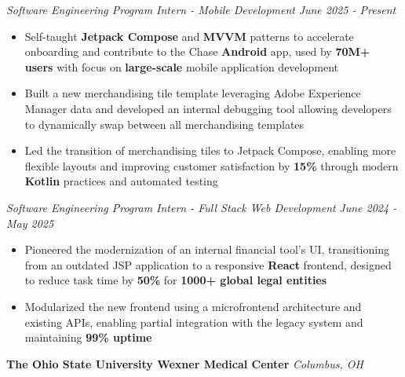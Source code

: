 \documentclass[letterpaper]{article}
\newenvironment{tightitemize}{%
  \begin{itemize}\small\setlength{\baselineskip}{0.95\baselineskip}\itemsep -1mm%
}{\end{itemize}}
\begin{document}
    \textit{Software Engineering Program Intern - Mobile Development} \hfill \textsl{June 2025 - Present}\\
    \vspace{-7pt}
    \begin{tightitemize} \itemsep -1mm

            \item Self-taught \textbf{Jetpack Compose} and \textbf{MVVM} patterns to accelerate onboarding and contribute to the Chase \textbf{Android} app, used by \textbf{70M+ users} with focus on \textbf{large-scale} mobile application development
            
            \item Built a new merchandising tile template leveraging Adobe Experience Manager data and developed an internal debugging tool allowing developers to dynamically swap between all merchandising templates
            
            \item Led the transition of merchandising tiles to Jetpack Compose, enabling more flexible layouts and improving customer satisfaction by \textbf{15\%} through modern \textbf{Kotlin} practices and automated testing
                    
    \end{tightitemize}
    \textit{Software Engineering Program Intern - Full Stack Web Development} \hfill \textsl{June 2024 - May 2025}\\
    \vspace{-7pt}
    \begin{tightitemize} \itemsep -1mm

            \item Pioneered the modernization of an internal financial tool's UI, transitioning from an outdated JSP application to a responsive \textbf{React} frontend, designed to reduce task time by \textbf{50\%} for \textbf{1000+ global legal entities}

            \item Modularized the new frontend using a microfrontend architecture and existing APIs, enabling partial integration with the legacy system and maintaining \textbf{99\% uptime}
                    
    \end{tightitemize}
    \vspace{-2mm}

    \textbf{The Ohio State University Wexner Medical Center} \hfill \textsl{Columbus, OH}\\
    
\end{document}

